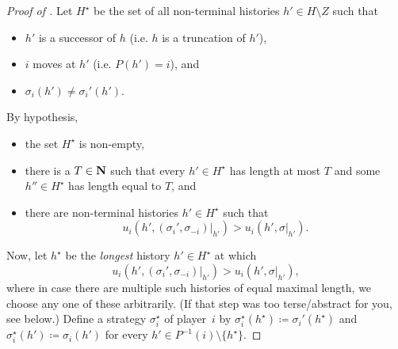\begin{proof}[Proof of ]
	Let $H^\star$ be the set of all non-terminal histories $h' \in H \setminus Z$ such that

	\begin{itemize}
	
		\item $h'$ is a successor of $h$ (i.e. $h$ is a truncation of $h'$),

		\item $i$ moves at $h'$ (i.e. $P(h') = i$), and

		\item $\sigma_i(h') \neq \sigma_i'(h')$.
	
	\end{itemize}
	By hypothesis,
	
	\begin{itemize}
	
		\item the set $H^\star$ is non-empty,

		\item there is a $T \in \mathbf{N}$ such that every $h' \in H^\star$ has length at most $T$ and some $h'' \in H^\star$ has length equal to $T$, and

		\item there are non-terminal histories $h' \in H^\star$ such that
		\begin{equation*}
			u_i\left( h', (\sigma_i',\sigma_{-i})|_{h'} \right)
			> u_i\left( h', \sigma|_{h'} \right) .
		\end{equation*}
	
	\end{itemize}
	Now, let $h^\star$ be the \emph{longest} history $h' \in H^\star$ at which 
	\begin{equation*}
		u_i( h', (\sigma_i',\sigma_{-i})|_{h'} )
		> u_i( h', \sigma|_{h'} ) ,
	\end{equation*}
	where in case there are multiple such histories of equal maximal length, we choose any one of these arbitrarily. (If that step was too terse/abstract for you, see  below.)
	Define a strategy $\sigma_i^\star$ of player~$i$ by $\sigma_i^\star(h^\star) \coloneqq \sigma_i'(h^\star)$ and $\sigma_i^\star(h') \coloneqq \sigma_i(h')$ for every $h' \in P^{-1}(i) \setminus \{h^\star\}$.
\end{proof}

